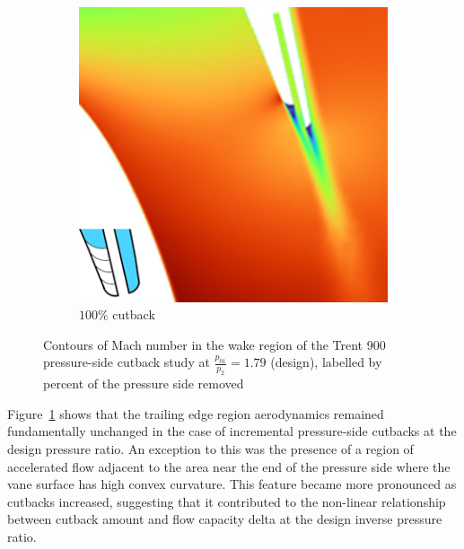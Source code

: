 \documentclass[a4paper, 11pt, oneside]{report}
\begin{document}
\begin{figure}[H]
\begin{subfigure}{.15\textwidth}
	\end{subfigure}
	\begin{subfigure}{.42\textwidth}
		\centering
		\includegraphics[width=\linewidth]{figs/ps_cutbacks_design_100.png}
		\caption{$100\%$ cutback}
	\end{subfigure}
	\caption{Contours of Mach number in the wake region of the Trent 900 pressure-side cutback study at $\frac{p_{01}}{p_2}=1.79$ (design), labelled by percent of the pressure side removed}
	\label{fig:ps_cutbacks_design}
\end{figure}

\newpage
Figure~\ref{fig:ps_cutbacks_design} shows that the trailing edge region aerodynamics remained fundamentally unchanged in the case of incremental pressure-side cutbacks at the design pressure ratio. An exception to this was the presence of a region of accelerated flow adjacent to the area near the end of the pressure side where the vane surface has high convex curvature. This feature became more pronounced as cutbacks increased, suggesting that it contributed to the non-linear relationship between cutback amount and flow capacity delta at the design inverse pressure ratio. 
\end{document}
